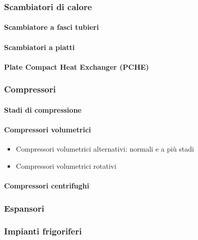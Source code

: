 \subsubsection{Scambiatori di calore}
\paragraph{Scambiatore a fasci tubieri}
\paragraph{Scambiatori a piatti}
\paragraph{Plate Compact Heat Exchanger (PCHE)}

\subsubsection{Compressori}
\paragraph{Stadi di compressione}
\paragraph{Compressori volumetrici}
\begin{itemize}
\item Compressori volumetrici alternativi: normali e a più stadi
\item Compressori volumetrici rotativi
\end{itemize}
\paragraph{Compressori centrifughi}

\subsubsection{Espansori}

\subsubsection{Impianti frigoriferi}





